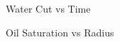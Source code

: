 \documentclass[12pt,letterpaper,titlepage]{article}
\begin{document}
\begin{figure}[p]
\caption{\label{fw}Water Cut vs Time}
\end{figure}
\begin{figure}[p]
\caption{\label{so}Oil Saturation vs Radius}
\end{figure}
\end{document}
